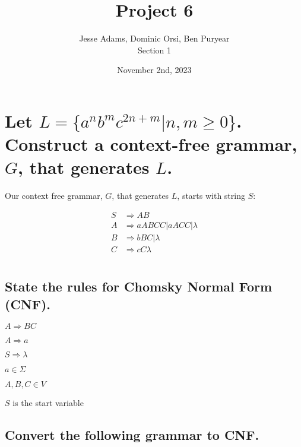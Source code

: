 \documentclass{article}
\title{Project 6}
\author{Jesse Adams, Dominic Orsi, Ben Puryear\\Section 1}
\date{November 2nd, 2023}
\begin{document}
\maketitle

\section{ Let $L = \{a^n b^m c^{2n+m} | n, m \ge 0\}$.  Construct a context-free grammar, $G$, that generates $L$.}

Our context free grammar, $G$, that generates $L$, starts with string $S$:

\begin{align*}
    S & \Rightarrow A B                           \\
    A & \Rightarrow a A B C C | a A C C | \lambda \\
    B & \Rightarrow b B C | \lambda               \\
    C & \Rightarrow c C \lambda
\end{align*}

\pagebreak

\section{}

\subsection{State the rules for Chomsky Normal Form (CNF).}

\begin{list}{}{A CFG is in CNF if every rule is of the form:}
    \item $A \Rightarrow BC$
    \item $A \Rightarrow a$
    \item $S \Rightarrow \lambda$
\end{list}

\begin{list}{}{Where:}
    \item $a \in \Sigma$
    \item $A, B, C \in V$
    \item $S$ is the start variable
\end{list}

\subsection{Convert the following grammar to CNF.}
\end{document}
